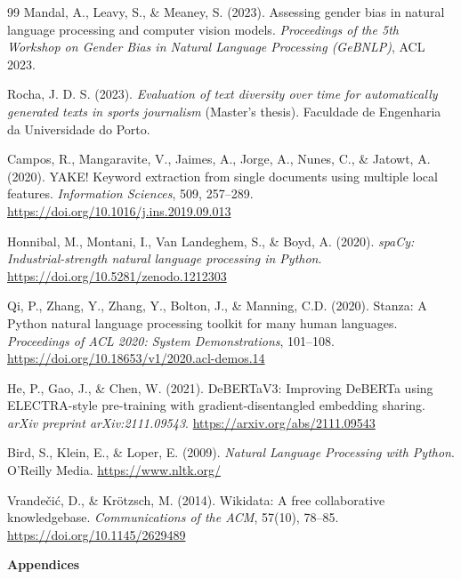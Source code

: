 \documentclass[11pt,a4paper]{article}
\begin{document}
\begin{thebibliography}{99}
Mandal, A., Leavy, S., \& Meaney, S. (2023).
Assessing gender bias in natural language processing and computer vision models.
\textit{Proceedings of the 5th Workshop on Gender Bias in Natural Language Processing (GeBNLP)}, ACL 2023.



Rocha, J. D. S. (2023).
\textit{Evaluation of text diversity over time for automatically generated texts in sports journalism} (Master's thesis).
Faculdade de Engenharia da Universidade do Porto.

Campos, R., Mangaravite, V., Jaimes, A., Jorge, A., Nunes, C., \& Jatowt, A. (2020).
YAKE! Keyword extraction from single documents using multiple local features.
\textit{Information Sciences}, 509, 257--289.
\url{https://doi.org/10.1016/j.ins.2019.09.013}

Honnibal, M., Montani, I., Van Landeghem, S., \& Boyd, A. (2020).
\textit{spaCy: Industrial-strength natural language processing in Python}.
\url{https://doi.org/10.5281/zenodo.1212303}

Qi, P., Zhang, Y., Zhang, Y., Bolton, J., \& Manning, C.D. (2020).
Stanza: A Python natural language processing toolkit for many human languages.
\textit{Proceedings of ACL 2020: System Demonstrations}, 101--108.
\url{https://doi.org/10.18653/v1/2020.acl-demos.14}

He, P., Gao, J., \& Chen, W. (2021).
DeBERTaV3: Improving DeBERTa using ELECTRA-style pre-training with gradient-disentangled embedding sharing.
\textit{arXiv preprint arXiv:2111.09543}.
\url{https://arxiv.org/abs/2111.09543}

Bird, S., Klein, E., \& Loper, E. (2009).
\textit{Natural Language Processing with Python}.
O'Reilly Media.
\url{https://www.nltk.org/}

Vrandečić, D., \& Krötzsch, M. (2014).
Wikidata: A free collaborative knowledgebase.
\textit{Communications of the ACM}, 57(10), 78--85.
\url{https://doi.org/10.1145/2629489}

\end{thebibliography}

\clearpage
{}
{}
{\centering\large\bfseries Appendices\par}
\vspace{0.8em}
\end{document}
